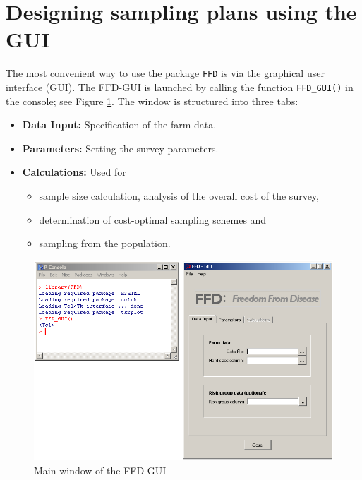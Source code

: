 \documentclass[nojss]{jss}
\begin{document}
\clearpage

\section{Designing sampling plans using the GUI} \label{sec:using-ffd-GUI}

The most convenient way to use the package \texttt{FFD} is via the   graphical user interface (GUI). The FFD-GUI is launched by calling the function \verb+FFD_GUI()+   in the  console; see Figure \ref{fig:GUI_Reset}. The window is structured into three tabs:

\begin{itemize}
\item \textbf{Data Input:} Specification of the farm data.
\item \textbf{Parameters:} Setting the survey parameters.
\item \textbf{Calculations:} Used for
    \begin{itemize}
    \item sample size calculation, analysis of the overall cost of the survey,
    \item determination of cost-optimal sampling schemes and
    \item sampling from the population.
    \end{itemize}
\end{itemize}


\begin{figure}[h!t]
\begin{center}
\includegraphics[width=120mm]{GUI_fresh.png}
\end{center}
\caption{Main window of the FFD-GUI}
\label{fig:GUI_Reset}
\end{figure}
\end{document}
